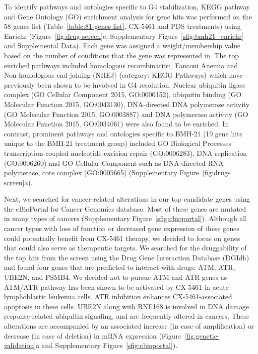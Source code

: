 To identify pathways and ontologies specific to G4 stabilization, KEGG pathway and Gene Ontology (GO) enrichment analysis for gene hits was performed on the 58 genes list (Table~\ref{table:81-genes list}, CX-5461 and PDS treatments) using Enrichr (Figure~\ref{fig:drug-screen}e, Supplementary Figure~\ref{sfig:bmh21_enrichr} and Supplemental Data)\cite{Chen2013,Kuleshov2016}. 
Each gene was assigned a weight/membership value based on the number of conditions that the gene was represented in. 
The top enriched pathways included homologous recombination, Fanconi Anemia  and Non-homologous end-joining (NHEJ) (category: KEGG Pathways) which have previously been shown to be involved in G4 resolution\cite{Sarkies2012,Piazza2010a,Paeschke2011a,Paeschke2013,Jimeno2018,Mendoza2016a,Eddy2014,Zimmer2015,Xu2017}. 
Nuclear ubiquitin ligase complex (GO Cellular Component 2015, GO:0000152), ubiquitin binding (GO Molecular Function 2015, GO:0043130), DNA-directed DNA polymerase activity (GO Molecular Function 2015, GO:0003887) and DNA polymerase activity (GO Molecular Function 2015, GO:0034061) were also found to be enriched. 
In contrast, prominent pathways and ontologies specific to BMH-21 (19 gene hits unique to the BMH-21 treatment group) included GO Biological Processes transcription-coupled nucleotide-excision repair (GO:0006283), DNA replication (GO:0006260) and GO Cellular Component such as DNA-directed RNA polymerase, core complex (GO:0005665) (Supplementary Figure~\ref{fig:drug-screen}a). 

Next, we searched for cancer-related alterations in our top candidate genes using the cBioPortal for Cancer Genomics database\cite{Cerami2012,Gao2013}. 
Most of these genes are mutated in many types of cancers (Supplementary Figure~\ref{sfig:cbioportal}). 
Although all cancer types with loss of function or decreased gene expression of these genes could potentially benefit from CX-5461 therapy, we decided to focus on genes that could also serve as therapeutic targets. We searched for the druggability of the top hits from the screen using the Drug Gene Interaction Database (DGIdb) and found four genes that are predicted to interact with drugs: ATM, ATR, UBE2N, and PSMB4. We decided not to pursue ATM and ATR genes as ATM/ATR pathway has been shown to be activated by CX-5461 in acute lymphoblastic leukemia cells\cite{Negi2015}. ATR inhibition enhances CX-5461-associated apoptosis in these cells. UBE2N along with RNF168 is involved in DNA damage response-related ubiquitin signaling, and are frequently altered in cancers. These alterations are accompanied by an associated increase (in case of amplification) or decrease (in case of deletion) in mRNA expression (Figure~\ref{fig:genetic-validation}a and Supplementary Figure~\ref{sfig:cbioportal}).

